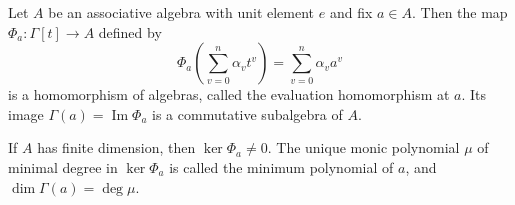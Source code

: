 Let $A$ be an associative algebra with unit element $e$ and fix $a \in A$. Then the map $\Phi_a: \Gamma[t] \to A$ defined by
$$\Phi_a\left(\sum_{v=0}^n \alpha_v t^v\right) = \sum_{v=0}^n \alpha_v a^v$$
is a homomorphism of algebras, called the evaluation homomorphism at $a$. Its image $\Gamma(a) = \operatorname{Im} \Phi_a$ is a commutative subalgebra of $A$.

If $A$ has finite dimension, then $\ker \Phi_a \neq 0$. The unique monic polynomial $\mu$ of minimal degree in $\ker \Phi_a$ is called the minimum polynomial of $a$, and $\dim \Gamma(a) = \deg \mu$.
